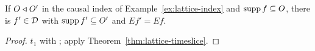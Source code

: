 \begin{corollary}\label{cor:lattice-dep}
If $O\mathrel{\triangleleft} O'$ in the causal index of Example~\ref{ex:lattice-index} and $\operatorname{supp} f\subseteq O$,
there is $f'\in\mathcal D$ with $\operatorname{supp} f'\subseteq O'$ and $Ef'=Ef$.
\end{corollary}
\begin{proof}
 $t_1$ with ;
apply Theorem~\ref{thm:lattice-timeslice}.
\end{proof}
